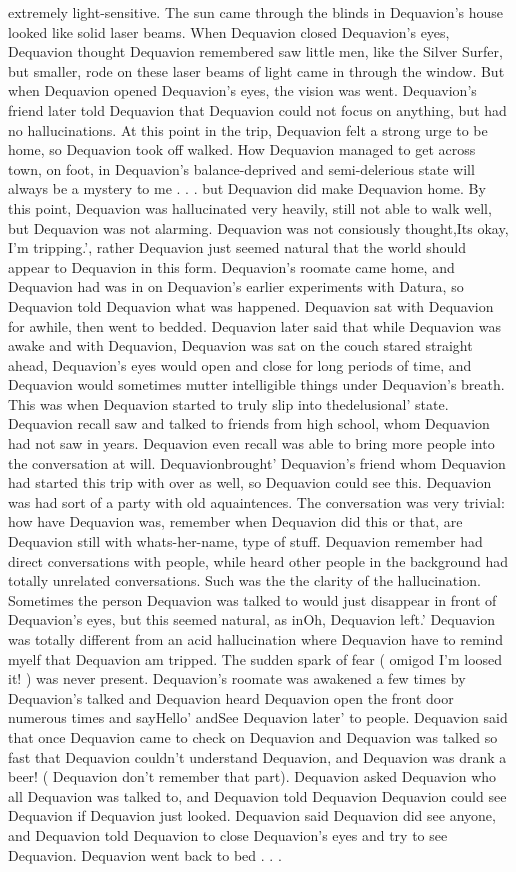\documentclass[12pt]{book}
\begin{document}
extremely light-sensitive. The sun came through the blinds in Dequavion's house looked like solid laser beams. When Dequavion closed Dequavion's eyes, Dequavion thought Dequavion remembered saw little men, like the Silver Surfer, but smaller, rode on these laser beams of light came in through the window. But when Dequavion opened Dequavion's eyes, the vision was went. Dequavion's friend later told Dequavion that Dequavion could not focus on anything, but had no hallucinations. At this point in the trip, Dequavion felt a strong urge to be home, so Dequavion took off walked. How Dequavion managed to get across town, on foot, in Dequavion's balance-deprived and semi-delerious state will always be a mystery to me . . .  but Dequavion did make Dequavion home. By this point, Dequavion was hallucinated very heavily, still not able to walk well, but Dequavion was not alarming. Dequavion was not consiously thought,Its okay, I'm tripping.', rather Dequavion just seemed natural that the world should appear to Dequavion in this form. Dequavion's roomate came home, and Dequavion had was in on Dequavion's earlier experiments with Datura, so Dequavion told Dequavion what was happened. Dequavion sat with Dequavion for awhile, then went to bedded. Dequavion later said that while Dequavion was awake and with Dequavion, Dequavion was sat on the couch stared straight ahead, Dequavion's eyes would open and close for long periods of time, and Dequavion would sometimes mutter intelligible things under Dequavion's breath. This was when Dequavion started to truly slip into thedelusional' state. Dequavion recall saw and talked to friends from high school, whom Dequavion had not saw in years. Dequavion even recall was able to bring more people into the conversation at will. Dequavionbrought' Dequavion's friend whom Dequavion had started this trip with over as well, so Dequavion could see this. Dequavion was had sort of a party with old aquaintences. The conversation was very trivial: how have Dequavion was, remember when Dequavion did this or that, are Dequavion still with whats-her-name, type of stuff. Dequavion remember had direct conversations with people, while heard other people in the background had totally unrelated conversations. Such was the the clarity of the hallucination. Sometimes the person Dequavion was talked to would just disappear in front of Dequavion's eyes, but this seemed natural, as inOh, Dequavion left.' Dequavion was totally different from an acid hallucination where Dequavion have to remind myelf that Dequavion am tripped. The sudden spark of fear ( omigod I'm loosed it! ) was never present. Dequavion's roomate was awakened a few times by Dequavion's talked and Dequavion heard Dequavion open the front door numerous times and sayHello' andSee Dequavion later' to people. Dequavion said that once Dequavion came to check on Dequavion and Dequavion was talked so fast that Dequavion couldn't understand Dequavion, and Dequavion was drank a beer! ( Dequavion don't remember that part). Dequavion asked Dequavion who all Dequavion was talked to, and Dequavion told Dequavion Dequavion could see Dequavion if Dequavion just looked. Dequavion said Dequavion did see anyone, and Dequavion told Dequavion to close Dequavion's eyes and try to see Dequavion. Dequavion went back to bed . . .  
\end{document}
